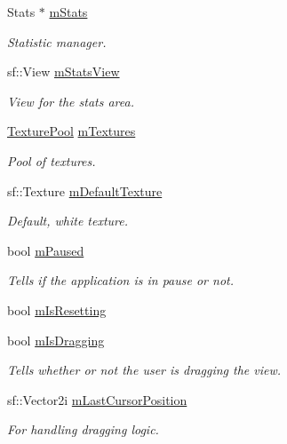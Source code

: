 \begin{DoxyCompactItemize}
Stats $\ast$ \hyperlink{class_application_a58c0745f95a42c636a1b914dac2e1ae6}{m\-Stats}
\begin{DoxyCompactList}\small\item\em Statistic manager. \end{DoxyCompactList}\item 
sf\-::\-View \hyperlink{class_application_a823c6ca5d9d397554b397810c940355a}{m\-Stats\-View}
\begin{DoxyCompactList}\small\item\em View for the stats area. \end{DoxyCompactList}\item 
\hyperlink{class_application_a5d2ae97c527f0ba88c259f2fdcecbb9b}{Texture\-Pool} \hyperlink{class_application_adee1221b74e94ac0fe94b3c99f52e03a}{m\-Textures}
\begin{DoxyCompactList}\small\item\em Pool of textures. \end{DoxyCompactList}\item 
sf\-::\-Texture \hyperlink{class_application_a79cda06cffa4e262a9c4ec066726831d}{m\-Default\-Texture}
\begin{DoxyCompactList}\small\item\em Default, white texture. \end{DoxyCompactList}\item 
bool \hyperlink{class_application_a29fd44db5b424d85f0fd35eee2494d1e}{m\-Paused}
\begin{DoxyCompactList}\small\item\em Tells if the application is in pause or not. \end{DoxyCompactList}\item 
bool \hyperlink{class_application_a2e3fd7543cf6e9a1da9940b60c512456}{m\-Is\-Resetting}
\item 
bool \hyperlink{class_application_a2d1510e1159955e12660faf4ad1230a0}{m\-Is\-Dragging}
\begin{DoxyCompactList}\small\item\em Tells whether or not the user is dragging the view. \end{DoxyCompactList}\item 
sf\-::\-Vector2i \hyperlink{class_application_a26c9135cd4290fbd7619f58f1a0c602b}{m\-Last\-Cursor\-Position}
\begin{DoxyCompactList}\small\item\em For handling dragging logic. \end{DoxyCompactList}\end{DoxyCompactItemize}


